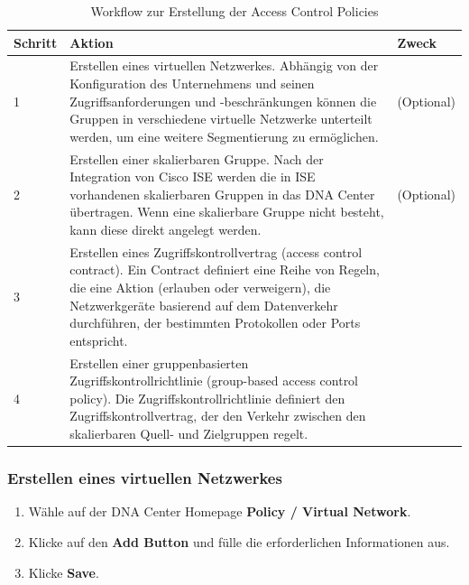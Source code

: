 \begin{table}[H]
	\centering
	\begin{tabularx}{\textwidth}{p{2 cm} | X | p{2 cm}}
		\rowcolor{gray!50}
		\textbf{Schritt} & \textbf{Aktion} & \textbf{Zweck} \\
		\hline	
		1 & Erstellen eines virtuellen Netzwerkes. Abhängig von der Konfiguration des Unternehmens und seinen Zugriffsanforderungen und -beschränkungen können die Gruppen in verschiedene virtuelle Netzwerke unterteilt werden, um eine weitere Segmentierung zu ermöglichen. & (Optional) \\
		2 & Erstellen einer skalierbaren Gruppe. Nach der Integration von Cisco ISE werden die in ISE vorhandenen skalierbaren Gruppen in das DNA Center übertragen. Wenn eine skalierbare Gruppe nicht besteht, kann diese direkt angelegt werden. & (Optional) \\
		3 & Erstellen eines Zugriffskontrollvertrag (access control contract). Ein Contract definiert eine Reihe von Regeln, die eine Aktion (erlauben oder verweigern), die Netzwerkgeräte basierend auf dem Datenverkehr durchführen, der bestimmten Protokollen oder Ports entspricht. & \\
		4 & Erstellen einer gruppenbasierten Zugriffskontrollrichtlinie (group-based access control policy). Die Zugriffskontrollrichtlinie definiert den Zugriffskontrollvertrag, der den Verkehr zwischen den skalierbaren Quell- und Zielgruppen regelt. & \\
		
	\end{tabularx}
	\caption{Workflow zur Erstellung der Access Control Policies}
	\label{tab:Workflow zur Erstellung der Access Control Policies}
\end{table}

\subsubsection{Erstellen eines virtuellen Netzwerkes}
\begin{enumerate}
	\item Wähle auf der DNA Center Homepage \textbf{Policy / Virtual Network}.
	\item Klicke auf den \textbf{Add Button} und fülle die erforderlichen Informationen aus.
	\item Klicke \textbf{Save}.
\end{enumerate}

